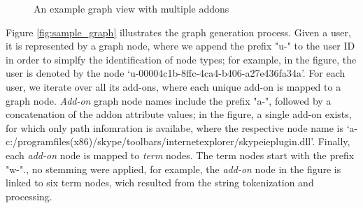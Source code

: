 \documentclass[11pt,oneside]{book}
\begin{document}
\begin{figure}
    \caption{An example graph view with multiple addons}
    \label{fig:sample_graph2}
  \end{figure}
  
Figure \ref{fig:sample_graph} illustrates the graph generation process. Given a user, it is represented by a graph node, where we append the prefix "u-" to the user ID in order to simplfy the identification of node types; for example, in the figure, the user is denoted by the node `u-00004c1b-8ffc-4ca4-b406-a27e436fa34a'. For each user, we iterate over all its add-ons, where each unique add-on is mapped to a graph node. {\it Add-on} graph node names include the prefix "a-", followed by a concatenation of the addon attribute values; in the figure, a single add-on exists, for which only path infomration is availabe, where the respective node name is `a-c:/programfiles(x86)/skype/toolbars/internetexplorer/skypeieplugin.dll'. Finally, each {\it add-on} node is mapped to {\it term} nodes. The term nodes start with the prefix "w-"., no stemming were applied, for example, the {\it add-on} node in the figure is linked to six term nodes, wich resulted from the string tokenization and processing. 
  
\end{document}
